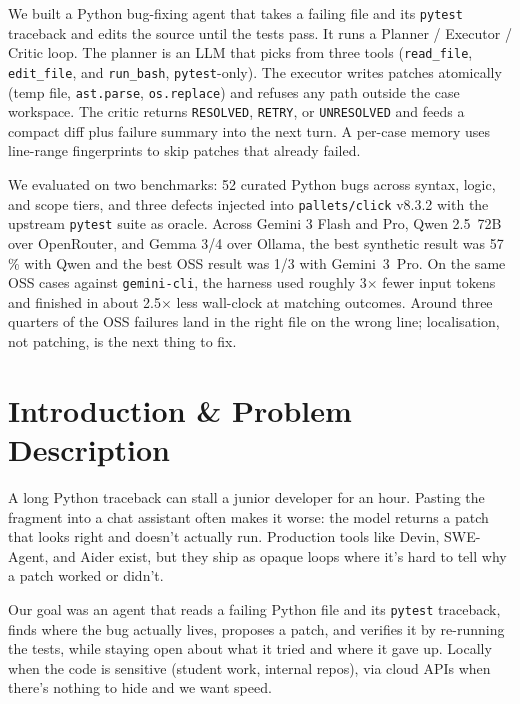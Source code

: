 \documentclass[11pt,letterpaper]{article}
\begin{document}
We built a Python bug-fixing agent that takes a failing file and its \texttt{pytest} traceback and edits the source until the tests pass. It runs a Planner / Executor / Critic loop. The planner is an LLM that picks from three tools (\texttt{read\_file}, \texttt{edit\_file}, and \texttt{run\_bash}, \texttt{pytest}-only). The executor writes patches atomically (temp file, \texttt{ast.parse}, \texttt{os.replace}) and refuses any path outside the case workspace. The critic returns \texttt{RESOLVED}, \texttt{RETRY}, or \texttt{UNRESOLVED} and feeds a compact diff plus failure summary into the next turn. A per-case memory uses line-range fingerprints to skip patches that already failed.

We evaluated on two benchmarks: 52 curated Python bugs across syntax, logic, and scope tiers, and three defects injected into \texttt{pallets/click} v8.3.2 with the upstream \texttt{pytest} suite as oracle. Across Gemini 3 Flash and Pro, Qwen 2.5~72B over OpenRouter, and Gemma 3/4 over Ollama, the best synthetic result was 57\,\% with Qwen and the best OSS result was 1/3 with Gemini~3~Pro. On the same OSS cases against \texttt{gemini-cli}, the harness used roughly 3$\times$ fewer input tokens and finished in about 2.5$\times$ less wall-clock at matching outcomes. Around three quarters of the OSS failures land in the right file on the wrong line; localisation, not patching, is the next thing to fix.

\section{Introduction \& Problem Description}

A long Python traceback can stall a junior developer for an hour. Pasting the fragment into a chat assistant often makes it worse: the model returns a patch that looks right and doesn't actually run. Production tools like Devin, SWE-Agent, and Aider exist, but they ship as opaque loops where it's hard to tell why a patch worked or didn't.

Our goal was an agent that reads a failing Python file and its \texttt{pytest} traceback, finds where the bug actually lives, proposes a patch, and verifies it by re-running the tests, while staying open about what it tried and where it gave up. Locally when the code is sensitive (student work, internal repos), via cloud APIs when there's nothing to hide and we want speed.
\end{document}

